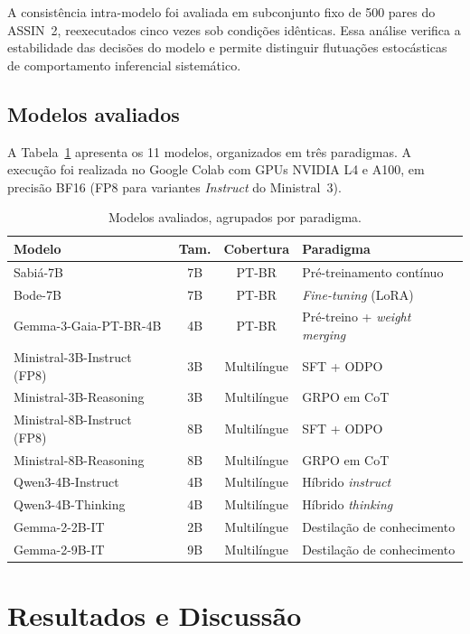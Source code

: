 \documentclass[12pt]{article}
\begin{document}
A consistência intra-modelo foi avaliada em subconjunto fixo de 500 pares do
ASSIN~2, reexecutados cinco vezes sob condições idênticas. Essa análise verifica
a estabilidade das decisões do modelo e permite distinguir flutuações
estocásticas de comportamento inferencial sistemático.

\subsection{Modelos avaliados}

A Tabela~\ref{tab:modelos} apresenta os 11 modelos, organizados em três
paradigmas. A execução foi realizada no Google Colab com GPUs NVIDIA L4 e A100,
em precisão BF16 (FP8 para variantes \emph{Instruct} do Ministral~3).

\begin{table}[ht]
\centering
\caption{Modelos avaliados, agrupados por paradigma.}
\label{tab:modelos}
\begin{tabular}{lccl}
\toprule
\textbf{Modelo} & \textbf{Tam.} & \textbf{Cobertura} & \textbf{Paradigma} \\
\midrule
Sabiá-7B                     & 7B & PT-BR        & Pré-treinamento contínuo \\
Bode-7B                      & 7B & PT-BR        & \emph{Fine-tuning} (LoRA) \\
Gemma-3-Gaia-PT-BR-4B        & 4B & PT-BR        & Pré-treino + \emph{weight merging} \\
Ministral-3B-Instruct (FP8)  & 3B & Multilíngue  & SFT + ODPO \\
Ministral-3B-Reasoning       & 3B & Multilíngue  & GRPO em CoT \\
Ministral-8B-Instruct (FP8)  & 8B & Multilíngue  & SFT + ODPO \\
Ministral-8B-Reasoning       & 8B & Multilíngue  & GRPO em CoT \\
Qwen3-4B-Instruct            & 4B & Multilíngue  & Híbrido \emph{instruct} \\
Qwen3-4B-Thinking            & 4B & Multilíngue  & Híbrido \emph{thinking} \\
Gemma-2-2B-IT                & 2B & Multilíngue  & Destilação de conhecimento \\
Gemma-2-9B-IT                & 9B & Multilíngue  & Destilação de conhecimento \\
\bottomrule
\end{tabular}
\end{table}

\section{Resultados e Discussão}
\end{document}
